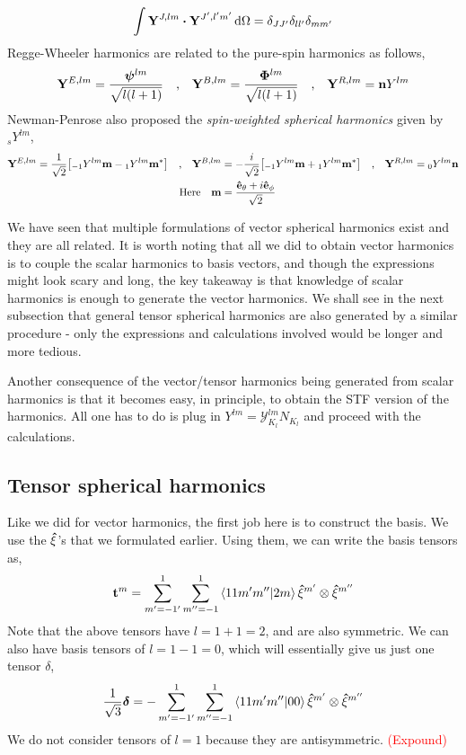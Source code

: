 \documentclass[a4paper,11pt]{article}
\begin{document}
\begin{equation*}
\int \vb{Y}^{J,lm} \vdot \vb{Y}^{J',l'm'} \dd{\Omega} = \delta_{J J'} \delta_{l l'} \delta_{m m'}
\end{equation*}
Regge-Wheeler harmonics are related to the pure-spin harmonics as follows,
\begin{align*}
\vb{Y}^{E,lm} = \dfrac{\bm{\psi}^{lm}}{\sqrt{l(l+1)}} \qq{,}
\vb{Y}^{B,lm}= \dfrac{\bm{\Phi}^{lm}}{\sqrt{l(l+1)}} \qq{,}
\vb{Y}^{R,lm} = \vb{n} Y^{lm}
\end{align*}
Newman-Penrose also proposed the \textit{spin-weighted spherical harmonics} given by $ _s Y^{lm} $,
\begin{align*}
\vb{Y}^{E,lm} = \dfrac{1}{\sqrt{2}} \qty[_{-1}Y^{lm} \vb{m} - {}_{1}Y^{lm} \vb{m^*} ] \qq{,}
\vb{Y}^{B,lm} & =- \dfrac{i}{\sqrt{2}}\qty[_{-1}Y^{lm} \vb{m} + {}_{1}Y^{lm} \vb{m^*} ] \qq{,} \vb{Y}^{R,lm} = {}_0 Y^{lm} \vb{n}\\
\qq{Here} \vb{m} &= \dfrac{\vu{e}_{\theta} + i\vu{e}_{\phi}}{\sqrt{2}}
\end{align*}

We have seen that multiple formulations of vector spherical harmonics exist and they are all related. It is worth noting that all we did to obtain vector harmonics is to couple the scalar harmonics to basis vectors, and though the expressions might look scary and long, the key takeaway is that knowledge of scalar harmonics is enough to generate the vector harmonics. We shall see in the next subsection that general tensor spherical harmonics are also generated by a similar procedure - only the expressions and calculations involved would be longer and more tedious.

Another consequence of the vector/tensor harmonics being generated from scalar harmonics is that it becomes easy, in principle, to obtain the STF version of the harmonics. All one has to do is plug in $ Y^{lm} = \mathcal{Y}^{lm}_{K_l} N_{K_l} $ and proceed with the calculations.
\subsection{Tensor spherical harmonics}
Like we did for vector harmonics, the first job here is to construct the basis. We use the $ \vu{\xi} $'s that we formulated earlier. Using them, we can write the basis tensors as,
\begin{equation*}
\vb{t}^m =  \sum_{m'=-1'}^1 \sum_{m''=-1}^1 \ip{11m'm''}{2m} \vu{\xi}^{m'} \otimes \vu{\xi}^{m''}
\end{equation*}
Note that the above tensors have $ l=1+1 =2 $, and are also symmetric. We can also have basis tensors of $ l=1-1=0 $, which will essentially give us just one tensor $ \delta $,
\begin{equation*}
\dfrac{1}{\sqrt{3}}\bm{\delta} = - \sum_{m'=-1'}^1 \sum_{m''=-1}^1 \ip{11m'm''}{00} \vu{\xi}^{m'} \otimes \vu{\xi}^{m''}
\end{equation*}
We do not consider tensors of $ l=1 $ because they are antisymmetric. \textcolor{red}{(Expound)}
\end{document}
